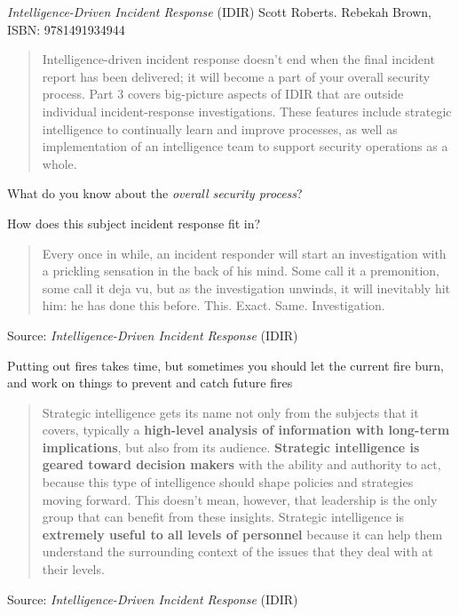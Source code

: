 \documentclass[Screen16to9,17pt]{foils}
\begin{document}

\emph{Intelligence-Driven Incident Response} (IDIR)
 Scott Roberts. Rebekah Brown, ISBN: 9781491934944

\begin{quote}
Intelligence-driven incident response doesn’t end when the final incident report has been delivered; it will become a part of your overall security process. Part 3 covers big-picture aspects of IDIR that are outside individual incident-response investigations. These features include strategic intelligence to continually learn and improve processes, as well as implementation of an intelligence team to support security operations as a whole.
\end{quote}

\begin{list2}
\item What do you know about the \emph{overall security process}?
\item How does this subject incident response fit in?
\end{list2}




\begin{quote}
Every once in while, an incident responder will start an investigation with a prickling
sensation in the back of his mind. Some call it a premonition, some call it deja vu, but
as the investigation unwinds, it will inevitably hit him: he has done this before. This.
Exact. Same. Investigation.
\end{quote}
Source: \emph{Intelligence-Driven Incident Response} (IDIR)


\begin{list2}
\item Putting out fires takes time, but sometimes you should let the current fire burn, and work on things to prevent and catch future fires
\end{list2}




\begin{quote}
Strategic intelligence gets its name not only from the subjects that it covers, typically a {\bf high-level analysis of information with long-term implications}, but also from its audience. {\bf Strategic intelligence is geared toward decision makers} with the ability and authority to act, because this type of intelligence should shape policies and strategies moving forward. This doesn’t mean, however, that leadership is the only group that can benefit from these insights. Strategic intelligence is {\bf extremely useful to all levels of personnel} because it can help them understand the surrounding context of the issues that they deal with at their levels.
\end{quote}
Source: \emph{Intelligence-Driven Incident Response} (IDIR)
\end{document}
